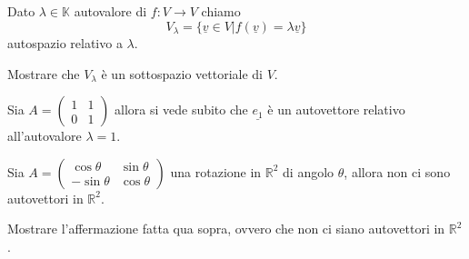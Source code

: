 \begin{definition}
    Dato $\lambda \in \mathbb{K}$ autovalore di $f: V \to V$ chiamo
    $$
        V_\lambda = \{ \underline{v} \in V | f(\underline{v}) = \lambda \underline{v} \}
    $$
    autospazio relativo a $\lambda$.
\end{definition}
\begin{exercise}
    Mostrare che $V_\lambda$ è un sottospazio vettoriale di $V$.
\end{exercise}
\begin{example}
    Sia $A = \begin{pmatrix}
     1 & 1 \\
     0 & 1
    \end{pmatrix}$ allora si vede subito che $\underline{e_1}$ è un autovettore relativo all'autovalore $\lambda = 1$.
\end{example}
\begin{example}
    Sia $A = \begin{pmatrix}
        \cos{\theta} & \sin{\theta} \\
        -\sin{\theta} & \cos{\theta}
    \end{pmatrix}$  una rotazione in $\mathbb{R}^2$ di angolo $\theta$, allora non ci sono autovettori in $\mathbb{R}^2$.
\end{example}
\begin{exercise}
    Mostrare l'affermazione fatta qua sopra, ovvero che non ci siano autovettori in $\mathbb{R}^2$.
\end{exercise}
